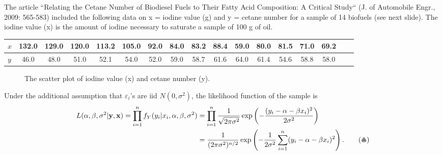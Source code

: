 \begin{example}
The article ``Relating the Cetane Number of Biodiesel
 Fuels to Their Fatty Acid Composition: A Critical Study``
 (J. of Automobile Engr., 2009: 565-583) included the 
following data on x = iodine value (g) and y = cetane
 number for a sample of 14 biofuels (see next slide).
The iodine value (x) is the amount of iodine necessary to 
saturate a sample of 100 g of oil.

\begin{table}[h!]
    \centering
    \small
    \begin{tabular}{l|cccccccccccccccc}
    \hline
    $x$ & 132.0 & 129.0 & 120.0 & 113.2 & 105.0 & 92.0 & 84.0 & 83.2 & 88.4 & 59.0 & 80.0 & 81.5 & 71.0 & 69.2\\
    \hline
    $y$ & 46.0 & 48.0 & 51.0 & 52.1 & 54.0 & 52.0 & 59.0 & 58.7 & 61.6 & 64.0 & 61.4 & 54.6 & 58.8 & 58.0\\
    \hline
    \end{tabular}
\end{table}

\begin{figure}[ht]
    \centering
    \caption{The scatter plot of iodine value (x) and cetane number (y).}
\end{figure}

Under the additional assumption that $\varepsilon_i$'s are iid $N(0, \sigma^2)$, the likelihood function of the sample is
\begin{align*}
    L(\alpha, \beta, \sigma^2 | \mathbf{y}, \mathbf{x}) = \prod_{i=1}^n f_Y(y_i | x_i, \alpha, \beta, \sigma^2) &= \prod_{i=1}^n \frac{1}{\sqrt{2\pi\sigma^2}} \exp\left(-\frac{(y_i - \alpha - \beta x_i)^2}{2\sigma^2}\right)\\
    &= \frac{1}{(2\pi\sigma^2)^{n/2}} \exp\left(-\frac{1}{2\sigma^2} \sum_{i=1}^n (y_i - \alpha - \beta x_i)^2\right). \label{eq:s2.1} \tag{{\color{gray} $\spadesuit $}} 
\end{align*}


\end{example}
